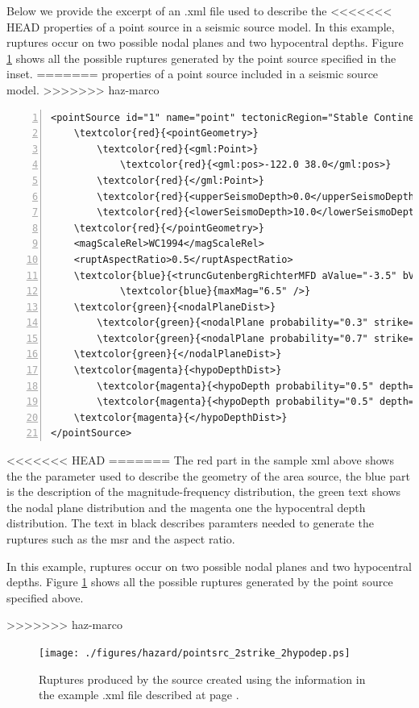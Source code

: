 Below we provide the excerpt of an .xml file used to describe the 
<<<<<<< HEAD
properties of a point source in a seismic source model.
In this example, ruptures occur on two possible nodal planes and two 
hypocentral depths. Figure \ref{fig:point_source_ruptures} shows all 
the possible ruptures generated by the point source specified in the 
inset.
=======
properties of a point source included in a seismic source model.
>>>>>>> haz-marco
\label{page:xml_point}
\begin{Verbatim}[frame=single, commandchars=\\\{\}, fontsize=\footnotesize,
    numbers=left, numbersep=2pt]
<pointSource id="1" name="point" tectonicRegion="Stable Continental Crust">
    \textcolor{red}{<pointGeometry>}
        \textcolor{red}{<gml:Point>}
            \textcolor{red}{<gml:pos>-122.0 38.0</gml:pos>}
        \textcolor{red}{</gml:Point>}
        \textcolor{red}{<upperSeismoDepth>0.0</upperSeismoDepth>}
        \textcolor{red}{<lowerSeismoDepth>10.0</lowerSeismoDepth>}
    \textcolor{red}{</pointGeometry>}
    <magScaleRel>WC1994</magScaleRel>
    <ruptAspectRatio>0.5</ruptAspectRatio>
    \textcolor{blue}{<truncGutenbergRichterMFD aValue="-3.5" bValue="1.0" minMag="5.0" }
			\textcolor{blue}{maxMag="6.5" />}
    \textcolor{green}{<nodalPlaneDist>}
        \textcolor{green}{<nodalPlane probability="0.3" strike="0.0" dip="90.0" rake="0.0" />}
        \textcolor{green}{<nodalPlane probability="0.7" strike="90.0" dip="45.0" rake="90.0" />}
    \textcolor{green}{</nodalPlaneDist>}
    \textcolor{magenta}{<hypoDepthDist>}
        \textcolor{magenta}{<hypoDepth probability="0.5" depth="4.0" />}
        \textcolor{magenta}{<hypoDepth probability="0.5" depth="8.0" />}
    \textcolor{magenta}{</hypoDepthDist>}
</pointSource>
\end{Verbatim}
<<<<<<< HEAD
=======
The red part in the sample xml above shows the the parameter used to 
describe the geometry of the area source, the blue part is the description
of the magnitude-frequency distribution, the green text shows the nodal 
plane distribution and the magenta one the hypocentral depth distribution.
The text in black describes paramters needed to generate the ruptures 
such as the \gls{msr} and the aspect ratio.

In this example, ruptures occur on two possible nodal planes and two 
hypocentral depths. Figure \ref{fig:point_source_ruptures} shows all 
the possible ruptures generated by the point source specified above.

>>>>>>> haz-marco
\begin{figure}[!ht]
\centering
\texttt{[image: ./figures/hazard/pointsrc\_2strike\_2hypodep.ps]}
\caption{Ruptures produced by the source created using the information 
    in the example .xml file described at page \pageref{page:xml_point}.}
\label{fig:point_source_ruptures}
\end{figure}
%
